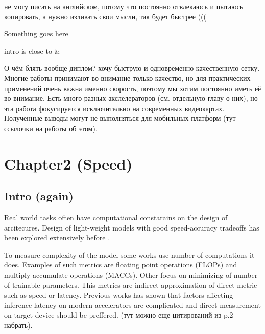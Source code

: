 не могу писать на английском, потому что постоянно отвлекаюсь и пытаюсь копировать, а нужно изливать свои мысли, так будет быстрее (((




Something goes here

intro is close to \cite{lin2020neural_genet} & \cite{ridnik2021_tresnet}

О чём блять вообще диплом? хочу быструю и одновременно качественную сетку. 
Многие работы принимают во внимание только качество, но для практических применений очень важна именно скорость, поэтому мы хотим постоянно иметь её во внимание. Есть много разных акслелераторов (см. отдельную главу о них), но эта работа фокусируется исключительно на современных видеокартах. Полученные выводы могут не выполняться для мобильных платформ (тут ссылочки на работы об этом). 


\chapter{Chapter2 (Speed)}



\section{Intro (again)}

Real world tasks often have computational constarains on the design of arcitecures. Design of light-weight models with good speed-accuracy tradeoffs has been explored extensively before \cite{Xception} \cite{mobilenetv1} \cite{mobilenetv2} \cite{ma2018shufflenetv2} \cite{zhang2018shufflenet}. 

To measure complexity of the model some works use number of computations it does. Examples of such metrics are floating point operations (FLOPs) and multiply-accumulate operations (MACCs). Other focus on minimizing of number of trainable parameters. This metrics are indirect approximation of direct metric such as speed or latency. Previous works has shown \cite{design_spaces} that factors affecting inference latency on modern accelerators are complicated and direct measurement on target device should be preffered. (тут можно еще цитирований из \cite{ma2018shufflenetv2} p.2 набрать).

